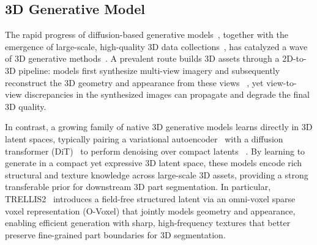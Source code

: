 \subsection{3D Generative Model}
The rapid progress of diffusion-based generative models~\cite{ho2020ddpm,song2020ddim}, together with the emergence of large-scale, high-quality 3D data collections~\cite{deitke2023objaverse,deitke2024objaversexl}, has catalyzed a wave of 3D generative methods~\cite{liu2024one2345,liu2023syncdreamer,long2024wonder3d,hong2023lrm,tang2025lgm,huang2024epidiff,zhang2024clay,wu2024unique3d,li2024craftsman,wen2024ouroboros3d,xu2024instantmesh,voleti2025sv3d,wang2024crm,liu2024one2345++,wu2024direct3d,zhao2024michelangelo,roessle2024l3dg,wu2024blockfusion,meng2024lt3sd,liu2024part123,dong2025tela,chen2024meshxlneuralcoordinatefield,chen2024meshanythingartistcreatedmeshgeneration,wang2024llamameshunifying3dmesh,hao2024meshtronhighfidelityartistlike3d,he2024neurallightrigunlockingaccurate,gao2025meshartgeneratingarticulatedmeshes,zhao2025deepmeshautoregressiveartistmeshcreation,wei2025octgptoctreebasedmultiscaleautoregressive,li2025step1x3dhighfidelitycontrollablegeneration,ye2025shapellmomninativemultimodalllm}.
A prevalent route builds 3D assets through a 2D-to-3D pipeline: models first synthesize multi-view imagery and subsequently reconstruct the 3D geometry and appearance from these views
~\cite{liu2023syncdreamer,long2024wonder3d,tang2025lgm,wen2024ouroboros3d,xu2024instantmesh,wang2024crm,voleti2025sv3d,huang2024mvadapter,qu2025deocc1to33ddeocclusionsingle,huang2025stereogsmultiviewstereovision}, yet view-to-view discrepancies in the synthesized images can propagate and degrade the final 3D quality.

In contrast, a growing family of native 3D generative models learns directly in 3D latent spaces, typically pairing a variational autoencoder~\cite{kingma2013vae} with a diffusion transformer (DiT)~\cite{peebles2023dit} to perform denoising over compact latents
~\cite{zhang2024clay,li2024craftsman,wu2024direct3d,zhao2024michelangelo,li2025triposg,chen2025ultra3defficienthighfidelity3d,dong2025morecontextuallatents3d,zhao2025assemblerscalable3dassembly,tang2025efficientpartlevel3dobject,lin2025partcrafterstructured3dmesh,wu2025dipodualstateimagescontrolled,wu2025direct3ds2gigascale3dgeneration,li2025triposghighfidelity3dshape,trellis,li2025craftsman3dhighfidelitymeshgeneration,trellis2}.
By learning to generate in a compact yet expressive 3D latent space, these models encode rich structural and texture knowledge across large-scale 3D assets, providing a strong transferable prior for downstream 3D part segmentation.
In particular, TRELLIS2~\cite{trellis2} introduces a field-free structured latent via an omni-voxel sparse voxel representation (O-Voxel) that jointly models geometry and appearance, enabling efficient generation with sharp, high-frequency textures that better preserve fine-grained part boundaries for 3D segmentation.